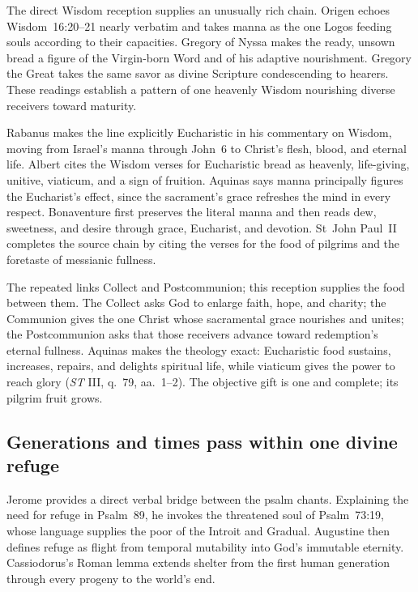 The direct Wisdom reception supplies an unusually rich chain. Origen echoes
Wisdom~16:20--21 nearly verbatim and takes manna as the one Logos feeding souls
according to their capacities. Gregory of Nyssa makes the ready, unsown bread
a figure of the Virgin-born Word and of his adaptive nourishment. Gregory the
Great takes the same savor as divine Scripture condescending to hearers. These
readings establish a pattern of one heavenly Wisdom nourishing diverse
receivers toward maturity.

Rabanus makes the line explicitly Eucharistic in his commentary on Wisdom,
moving from Israel's manna through John~6 to Christ's flesh, blood, and eternal
life. Albert cites the Wisdom verses for Eucharistic bread as heavenly,
life-giving, unitive, viaticum, and a sign of fruition. Aquinas says manna
principally figures the Eucharist's effect, since the sacrament's grace
refreshes the mind in every respect. Bonaventure first preserves the literal
manna and then reads dew, sweetness, and desire through grace, Eucharist, and
devotion. St~John Paul~II completes the source chain by citing the verses for
the food of pilgrims and the foretaste of messianic fullness.

The repeated  links Collect and Postcommunion; this reception
supplies the food between them. The Collect asks God to enlarge faith, hope, and charity;
the Communion gives the one Christ whose sacramental grace nourishes and
unites; the Postcommunion asks that those receivers advance toward redemption's
eternal fullness. Aquinas makes the theology exact: Eucharistic food sustains,
increases, repairs, and delights spiritual life, while viaticum gives the power
to reach glory (\emph{ST} III, q.~79, aa.~1--2). The objective gift is one and
complete; its pilgrim fruit grows.

\subsection*{Generations and times pass within one divine refuge\enspace
  }

Jerome provides a direct verbal bridge between the psalm chants. Explaining the
need for refuge in Psalm~89, he invokes the threatened soul of Psalm~73:19,
whose language supplies the poor of the Introit and Gradual. Augustine then
defines refuge as flight from temporal mutability into God's immutable
eternity. Cassiodorus's Roman lemma extends shelter from the first human
generation through every progeny to the world's end.

